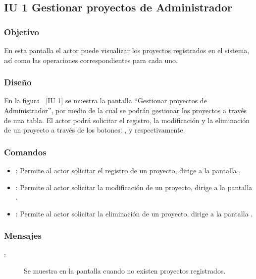 \subsection{IU 1 Gestionar proyectos de Administrador}
\subsubsection{Objetivo}
	
	En esta pantalla el actor puede visualizar los proyectos registrados en el sistema, así como las operaciones correspondientes para cada uno.

\subsubsection{Diseño}

    En la figura ~\ref{IU 1} se muestra la pantalla ``Gestionar proyectos de Administrador'', por medio de la cual 
    se podrán gestionar los proyectos a través de una tabla. El actor podrá solicitar el registro, la modificación y la eliminación 
    de un proyecto a través de los botones: , \btnEditar y \btnEliminar respectivamente. \\
    


\subsubsection{Comandos}
\begin{itemize}
	\item {}: Permite al actor solicitar el registro de un proyecto, dirige a la pantalla .
	\item \btnEditar[Modificar]: Permite al actor solicitar la modificación de un proyecto, dirige a la pantalla .
	\item \btnEliminar[Eliminar]: Permite al actor solicitar la eliminación de un proyecto, dirige a la pantalla .
\end{itemize}
\subsubsection{Mensajes}
	
\begin{description}
	\item[:] Se muestra en la pantalla  cuando no existen proyectos registrados.
\end{description}

